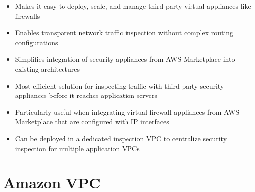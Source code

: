 \documentclass[11pt,a4paper]{report}
\begin{document}
\begin{itemize}
\begin{itemize}
  \item Makes it easy to deploy, scale, and manage third-party virtual appliances like firewalls
  \item Enables transparent network traffic inspection without complex routing configurations
  \item Simplifies integration of security appliances from AWS Marketplace into existing architectures
  \item Most efficient solution for inspecting traffic with third-party security appliances before it reaches application servers
  \item Particularly useful when integrating virtual firewall appliances from AWS Marketplace that are configured with IP interfaces
  \item Can be deployed in a dedicated inspection VPC to centralize security inspection for multiple application VPCs
\end{itemize}
\end{itemize}


\section{Amazon VPC}
\end{document}

